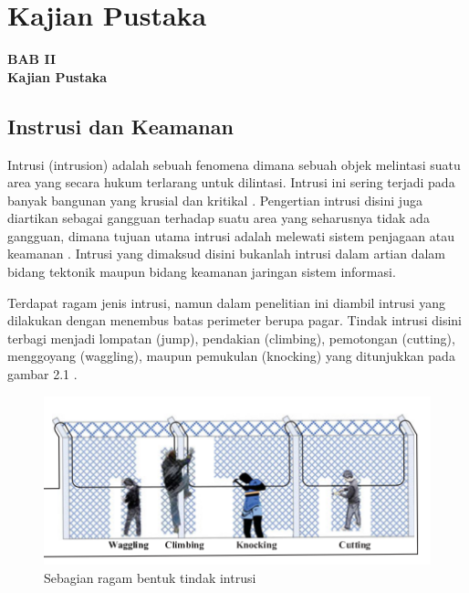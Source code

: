 \documentclass[12pt]{article}
\begin{document}



\newpage

	\setcounter{figure}{0}

	\section{Kajian Pustaka}
	
	\begin{center}
		{\large \textbf{BAB II}} \\
		{\large \textbf{Kajian Pustaka}}
	\end{center}

	\subsection{Instrusi dan Keamanan}
	
	Intrusi (intrusion) adalah sebuah fenomena dimana sebuah objek melintasi suatu area yang secara hukum terlarang untuk dilintasi.
	Intrusi ini sering terjadi pada banyak bangunan yang krusial dan kritikal \cite{Quwaider2017}.
	Pengertian intrusi disini juga diartikan sebagai gangguan terhadap suatu area yang seharusnya tidak ada gangguan, dimana tujuan utama intrusi adalah melewati sistem penjagaan atau keamanan \cite{Chapman}.
	Intrusi yang dimaksud disini bukanlah intrusi dalam artian dalam bidang tektonik maupun bidang keamanan jaringan sistem informasi.
	
	Terdapat ragam jenis intrusi, namun dalam penelitian ini diambil intrusi yang dilakukan dengan menembus batas perimeter berupa pagar.
	Tindak intrusi disini terbagi menjadi lompatan (jump), pendakian (climbing), pemotongan (cutting), menggoyang (waggling), maupun pemukulan (knocking) yang ditunjukkan pada gambar 2.1 \cite{Huang2017}.

	\begin{figure}[!ht]
		\centering
		\captionsetup{justification=centering}
   		\includegraphics[width=0.7\linewidth]{images/Bab_2/Bab_2_1}
		\caption[Ragam Intrusi]{\small{Sebagian ragam bentuk tindak intrusi}}
	\end{figure}
\end{document}
